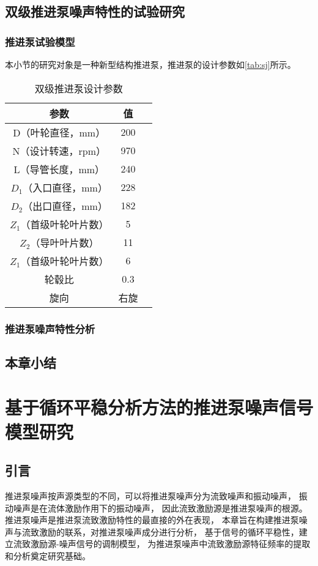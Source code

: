 \section{双级推进泵噪声特性的试验研究}
\subsection{推进泵试验模型}
本小节的研究对象是一种新型结构推进泵，推进泵的设计参数如\autoref{tab:sj}所示。
\begin{table}[htbp]
    \centering
    \caption{\label{tab:sj}双级推进泵设计参数}
    \begin{tabular}{ccc}
     \toprule
     参数&值\\
     \midrule
     D（叶轮直径，mm）&200\\
     N（设计转速，rpm）&970\\
     L（导管长度，mm）&240\\
     $D_1$（入口直径，mm）&228\\
     $D_2$（出口直径，mm）&182\\
     $Z_1$（首级叶轮叶片数）&5\\
     $Z_2$（导叶叶片数）&11\\
     $Z_1$（首级叶轮叶片数）&6\\
     轮毂比&0.3\\
     旋向&右旋\\
     \bottomrule
    \end{tabular}
\end{table}
\subsection{推进泵噪声特性分析}

\section{本章小结}
\chapter{基于循环平稳分析方法的推进泵噪声信号模型研究}
\section{引言}
推进泵噪声按声源类型的不同，可以将推进泵噪声分为流致噪声和振动噪声，
振动噪声是在流体激励作用下的振动噪声，
因此流致激励源是推进泵噪声的根源。
推进泵噪声是推进泵流致激励特性的最直接的外在表现，
本章旨在构建推进泵噪声与流致激励的联系，对推进泵噪声成分进行分析，
基于信号的循环平稳性，建立流致激励源-噪声信号的调制模型，
为推进泵噪声中流致激励源特征频率的提取和分析奠定研究基础。

